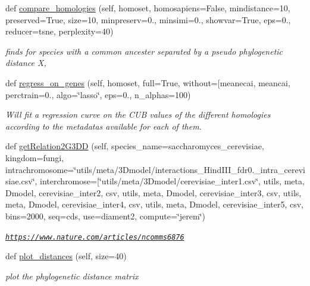 \begin{DoxyCompactItemize}
def \mbox{\hyperlink{class_py_c_u_b_1_1py_c_u_b_1_1_py_c_u_b_ad350376cd68d4daacec78c694ed754c6}{compare\+\_\+homologies}} (self, homoset, homosapiens=False, mindistance=10, preserved=True, size=10, minpreserv=0., minsimi=0., showvar=True, eps=0., reducer=\textquotesingle{}tsne\textquotesingle{}, perplexity=40)
\begin{DoxyCompactList}\small\item\em finds for species with a common ancester separated by a pseudo phylogenetic distance X, \end{DoxyCompactList}\item 
def \mbox{\hyperlink{class_py_c_u_b_1_1py_c_u_b_1_1_py_c_u_b_a1b65efe7deb4ba5f65203c8be6fc7af2}{regress\+\_\+on\+\_\+genes}} (self, homoset, full=True, without=\mbox{[}\textquotesingle{}meanecai\textquotesingle{}, meancai, perctrain=0., algo=\char`\"{}lasso\char`\"{}, eps=0., n\+\_\+alphas=100)
\begin{DoxyCompactList}\small\item\em Will fit a regression curve on the C\+UB values of the different homologies according to the metadatas available for each of them. \end{DoxyCompactList}\item 
def \mbox{\hyperlink{class_py_c_u_b_1_1py_c_u_b_1_1_py_c_u_b_a5e869542b553c1541018263c5386acde}{get\+Relation2\+G3\+DD}} (self, species\+\_\+name=\textquotesingle{}saccharomyces\+\_\+cerevisiae\textquotesingle{}, kingdom=\textquotesingle{}fungi\textquotesingle{}, intrachromosome=\char`\"{}utils/meta/3\+Dmodel/interactions\+\_\+\+Hind\+I\+I\+I\+\_\+fdr0.\+\_\+intra\+\_\+cerevisiae.\+csv\char`\"{}, interchromose=\mbox{[}\char`\"{}utils/meta/3\+Dmodel/cerevisiae\+\_\+inter1.\+csv\char`\"{}, utils, meta, Dmodel, cerevisiae\+\_\+inter2, csv, utils, meta, Dmodel, cerevisiae\+\_\+inter3, csv, utils, meta, Dmodel, cerevisiae\+\_\+inter4, csv, utils, meta, Dmodel, cerevisiae\+\_\+inter5, csv, bins=2000, seq=\textquotesingle{}cds\textquotesingle{}, use=\textquotesingle{}diament2\textquotesingle{}, compute=\char`\"{}jerem\char`\"{})
\begin{DoxyCompactList}\small\item\em \href{https://www.nature.com/articles/ncomms6876}{\tt https\+://www.\+nature.\+com/articles/ncomms6876} \end{DoxyCompactList}\item 
def \mbox{\hyperlink{class_py_c_u_b_1_1py_c_u_b_1_1_py_c_u_b_a4e13b55153bbe774e9203818f2b7f690}{plot\+\_\+distances}} (self, size=40)
\begin{DoxyCompactList}\small\item\em plot the phylogenetic distance matrix \end{DoxyCompactList}\item 

\end{DoxyCompactItemize}
